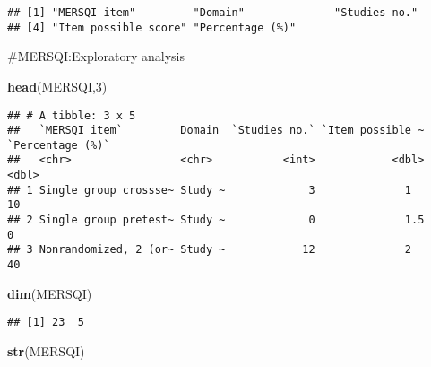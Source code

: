 \documentclass[]{article}
\newenvironment{Shaded}{\begin{snugshade}}{\end{snugshade}}
\newcommand{\DecValTok}[1]{\textcolor[rgb]{0.00,0.00,0.81}{#1}}
\newcommand{\KeywordTok}[1]{\textcolor[rgb]{0.13,0.29,0.53}{\textbf{#1}}}
\newcommand{\NormalTok}[1]{#1}
\begin{document}
\begin{verbatim}
## [1] "MERSQI item"         "Domain"              "Studies no."        
## [4] "Item possible score" "Percentage (%)"
\end{verbatim}

\#MERSQI:Exploratory analysis

\begin{Shaded}
\begin{Highlighting}[]
\KeywordTok{head}\NormalTok{(MERSQI,}\DecValTok{3}\NormalTok{)}
\end{Highlighting}
\end{Shaded}

\begin{verbatim}
## # A tibble: 3 x 5
##   `MERSQI item`         Domain  `Studies no.` `Item possible ~ `Percentage (%)`
##   <chr>                 <chr>           <int>            <dbl>            <dbl>
## 1 Single group crossse~ Study ~             3              1                 10
## 2 Single group pretest~ Study ~             0              1.5                0
## 3 Nonrandomized, 2 (or~ Study ~            12              2                 40
\end{verbatim}

\begin{Shaded}
\begin{Highlighting}[]
\KeywordTok{dim}\NormalTok{(MERSQI)}
\end{Highlighting}
\end{Shaded}

\begin{verbatim}
## [1] 23  5
\end{verbatim}

\begin{Shaded}
\begin{Highlighting}[]
\KeywordTok{str}\NormalTok{(MERSQI)}
\end{Highlighting}
\end{Shaded}
\end{document}
